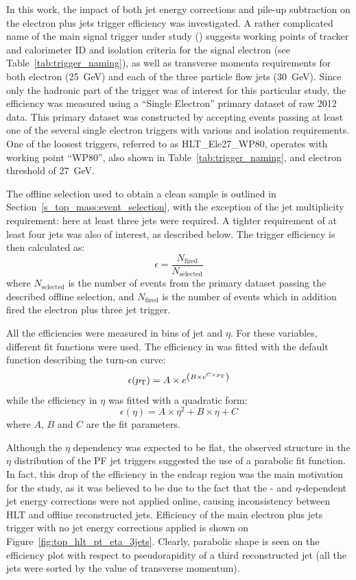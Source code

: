 In this work, the impact of both jet energy corrections and pile-up subtraction on the electron plus jets trigger
efficiency was investigated. A rather complicated name of the main signal trigger under study (\HLTThreeCentralPFJet)
suggests working points of tracker and calorimeter ID and isolation criteria for the signal electron (see
Table~\ref{tab:trigger_naming}), as well as transverse momenta requirements for both electron (\SI{25}{\GeV}) and each
of the three particle flow jets (\SI{30}{\GeV}). Since only the hadronic part of the trigger was of interest for this
particular study, the efficiency was measured using a ``Single Electron'' primary dataset of raw 2012 data. This primary
dataset was constructed by accepting events passing at least one of the several single electron triggers with various
\pt and isolation requirements. One of the loosest triggers, referred to as HLT\_Ele27\_WP80, operates with working
point ``WP80'', also shown in Table~\ref{tab:trigger_naming}, and electron \pt threshold of \SI{27}{\GeV}.

The offline selection used to obtain a clean \ttbar sample is outlined in Section~\ref{s_top_mass:event_selection}, with
the exception of the jet multiplicity requirement: here at least three jets were required. A tighter requirement of at
least four jets was also of interest, as described below. The trigger efficiency is then calculated as:
\begin{equation}
\epsilon = \frac{N_{\text{fired}}}{N_{\text{selected}}}
\end{equation}
where $N_{\text{selected}}$ is the number of events from the primary dataset passing the described offline selection,
and $N_{\text{fired}}$ is the number of events which in addition fired the electron plus three jet trigger.

All the efficiencies were measured in bins of jet \pt and $\eta$. For these variables, different fit functions were
used. The efficiency in \pt was fitted with the default function describing the turn-on curve:
\begin{equation}
\epsilon(p_{\mathrm{T}}) = A \times e^{\left(B \times e^{C \times p_{\mathrm{T}}}\right)}
\end{equation}
while the efficiency in $\eta$ was fitted with a quadratic form:
\begin{equation}
\epsilon (\eta) = A \times \eta^2 + B \times \eta + C
\end{equation}
where $A$, $B$ and $C$ are the fit parameters.

Although the $\eta$ dependency was expected to be flat, the observed structure in the $\eta$ distribution of the PF jet
triggers suggested the use of a parabolic fit function. In fact, this drop of the efficiency in the endcap region was
the main motivation for the study, as it was believed to be due to the fact that the \pt- and $\eta$-dependent jet
energy corrections were not applied online, causing inconsistency between HLT and offline reconstructed jets. Efficiency
of the main electron plus jets trigger with no jet energy corrections applied is shown on
Figure~\ref{fig:top_hlt_pt_eta_3jets}. Clearly, parabolic shape is seen on the efficiency plot with respect to
pseudorapidity of a third reconstructed jet (all the jets were sorted by the value of transverse momentum).

